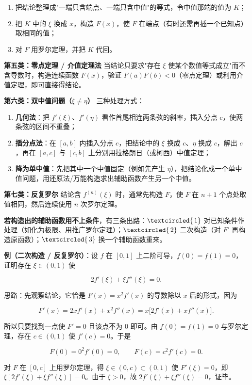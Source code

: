 \documentclass[11pt,openany,UTF8]{ctexbook}
\newcommand{\circled}[1]{\textcircled{\scriptsize\,#1}}
\begin{document}
\begin{enumerate}
\item 把结论整理成"一端只含端点、一端只含中值"的等式，令中值那端的值为 $K$；
\item 把 $K$ 中的 $\xi$ 换成 $x$，构造 $F(x)$，使 $F$ 在端点（有时还需再插一个已知点）取相同的值；
\item 对 $F$ 用罗尔定理，并把 $K$ 代回。
\end{enumerate}
\textbf{第五类：零点定理 / 介值定理法} 当结论只要求"存在 $\xi$ 使某个数值等式成立"而不含导数时，构造连续函数 $F(x)$，验证 $F(a)F(b)<0$（零点定理）或利用介值定理，即可直接得结论。

\textbf{第六类：双中值问题（$\xi\ne\eta$）} 三种处理方式：

\begin{enumerate}
\item \textbf{几何法}：把 $f'(\xi)$、$f'(\eta)$ 看作首尾相连两条弦的斜率，插入分点 $c$，使两条弦的区间不重叠；
\item \textbf{插分点法}：在 $[a,b]$ 内插入分点 $c$，把结论中的 $\xi$ 换成 $c$、$\eta$ 换成 $c$，解出 $c$，再在 $[a,c]$ 与 $[c,b]$ 上分别用拉格朗日（或柯西）中值定理；
\item \textbf{降为单中值}：先把其中一个中值固定（例如先产生 $\eta$），把结论化成一个单中值问题，用还原法/万能构造求出辅助函数产生另一个中值。
\end{enumerate}
\textbf{第七类：反复罗尔} 结论含 $f^{(n)}(\xi)$ 时，通常先构造 $F$，使 $F$ 在 $n+1$ 个点处取值相同，然后连续使用 $n$ 次罗尔定理。

\textbf{若构造出的辅助函数用不上条件}，有三条出路：$\circled{1}$ 对已知条件作处理（如化为极限、用推广罗尔定理）；$\circled{2}$ 二次构造（对 $F'$ 再构造原函数）；$\circled{3}$ 换一个辅助函数重来。

\textbf{例（二次构造 / 反复罗尔）}：设 $f$ 在 $[0,1]$ 上二阶可导，$f(0)=f(1)=0$，证明存在 $\xi\in(0,1)$ 使

\[2f'(\xi)+\xi f''(\xi)=0 .\]

思路：先观察结论，它恰是 $F(x)=x^2f'(x)$ 的导数除以 $x$ 后的形式，因为

\[F'(x)=2xf'(x)+x^2f''(x)=x\big[2f'(x)+xf''(x)\big].\]

所以只要找到一点使 $F'=0$ 且该点不为 $0$ 即可。由 $f(0)=f(1)=0$ 与罗尔定理，存在 $c\in(0,1)$ 使 $f'(c)=0$。于是

\[F(0)=0^2f'(0)=0,\qquad F(c)=c^2f'(c)=0 .\]

对 $F$ 在 $[0,c]$ 上用罗尔定理，得 $\xi\in(0,c)\subset(0,1)$ 使 $F'(\xi)=0$，即 $\xi[2f'(\xi)+\xi f''(\xi)]=0$。由于 $\xi>0$，故 $2f'(\xi)+\xi f''(\xi)=0$，证毕。
\end{document}
